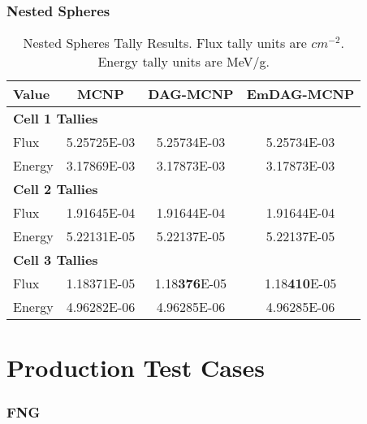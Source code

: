   \subsubsection{Nested Spheres}

  \begin{table}[H]
    \small
    \begin{center}
      \begin{tabular}{lccc}
        \toprule
        Value & MCNP & DAG-MCNP & EmDAG-MCNP \\
        \toprule
        \multicolumn{4}{l}{\textbf{Cell 1 Tallies}} \\
        \hline
        Flux    & 5.25725E-03 & 5.25734E-03 & 5.25734E-03 \\
        Energy  & 3.17869E-03 &  3.17873E-03 &  3.17873E-03 \\
        \hline
        \multicolumn{4}{l}{\textbf{Cell 2 Tallies}} \\
        \hline
        Flux    & 1.91645E-04 & 1.91644E-04 & 1.91644E-04 \\
        Energy  & 5.22131E-05 & 5.22137E-05 & 5.22137E-05 \\
        \hline
        \multicolumn{4}{l}{\textbf{Cell 3 Tallies}} \\
        \hline
        Flux    & 1.18371E-05 & 1.18\textbf{376}E-05 & 1.18\textbf{410}E-05 \\
        Energy  & 4.96282E-06 & 4.96285E-06 & 4.96285E-06 \\
        \bottomrule
        
      \end{tabular}
      \caption[Nested Spheres Tally Results.]{Nested Spheres Tally Results. Flux
        tally units are $cm^{-2}$. Energy tally units are MeV/g.}
      \label{nestedspheres}
    \end{center}
  \end{table}

  \section{Production Test Cases}
  
  \subsubsection{FNG}

